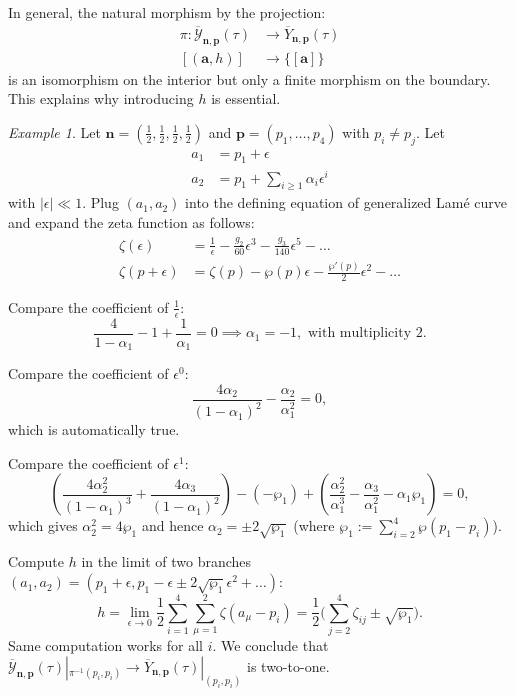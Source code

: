 \documentclass[11pt]{amsart}
\theoremstyle{remark}
\newtheorem{example}[theorem]{Example}
\numberwithin{equation}{section}
\begin{document}
In general, the natural morphism by the projection:
\[
\begin{split}
    \pi: \overline{\mathcal{Y}}_{\mathbf{n},\mathbf{p}}(\tau) &\rightarrow \overline{Y}_{\mathbf{n},\mathbf{p}}(\tau)
    \\
    [ (\mathbf{a},h) ] & \rightarrow \{ [\mathbf{a}] \}
\end{split}
\]
is an isomorphism on the interior but only a finite morphism on the boundary. This explains why introducing $h$ is essential.
\begin{example} \label{ex:primitive_two_h}
Let $\mathbf{n} = ( \frac{1}{2}, \frac{1}{2} ,\frac{1}{2}, \frac{1}{2})$ and $\mathbf{p} = (p_1,\dots,p_4)$ with $p_i \neq p_j$. 
Let
\begin{align*}
    a_1 &= p_1 + \epsilon \\
    a_2 &= p_1 + \sum_{i \ge 1} \alpha_i \epsilon^i
\end{align*}
with $|\epsilon| \ll 1$. Plug $(a_1, a_2)$ into the defining equation of generalized Lam\'e curve and expand the zeta function as follows:
\begin{align*}
    \zeta(\epsilon) &= \frac{1}{\epsilon} - \frac{g_2}{60}\epsilon^3 - \frac{g_3}{140}\epsilon^5 - \dots \\
    \zeta(p+\epsilon) &= \zeta(p) - \wp(p)\epsilon - \frac{\wp'(p)}{2}\epsilon^2 - \dots
\end{align*}

Compare the coefficient of $\frac{1}{\epsilon}$:
\begin{equation*}
    \frac{4}{1-\alpha_1} - 1 + \frac{1}{\alpha_1} = 0 \implies \alpha_1 = -1, \text{ with multiplicity 2}.
\end{equation*}

Compare the coefficient of $\epsilon^0$:
\begin{equation*}
    \frac{4\alpha_2}{(1-\alpha_1)^2} - \frac{\alpha_2}{\alpha_1^2} = 0,
\end{equation*}
which is automatically true.

Compare the coefficient of $\epsilon^1$:
\begin{equation*}
    \left( \frac{4\alpha_2^2}{(1-\alpha_1)^3} + \frac{4\alpha_3}{(1-\alpha_1)^2} \right) - (-\wp_1) + \left( \frac{\alpha_2^2}{\alpha_1^3} - \frac{\alpha_3}{\alpha_1^2} - \alpha_1\wp_1 \right) = 0,
\end{equation*}
which gives $\alpha_2^2 = 4\wp_1$ and hence $\alpha_2 = \pm 2\sqrt{\wp_1}$ (where $\wp_1 := \sum_{i=2}^4 \wp(p_1 - p_i)$).

Compute $h$ in the limit of two branches $(a_1, a_2) = (p_1 + \epsilon, p_1 - \epsilon \pm 2\sqrt{\wp_1}\epsilon^2 + \dots)$:
\[
    h = \lim_{\epsilon \rightarrow 0} \frac{1}{2} \sum_{i=1}^4\sum_{\mu=1}^2\zeta(a_\mu - p_i) = \frac{1}{2} \Big( \sum_{j=2}^4 \zeta_{ij} \pm \sqrt{\wp_1} \Big). 
\]
Same computation works for all $i$. We conclude that $\overline{\mathcal{Y}}_{\mathbf{n},\mathbf{p}}(\tau) |_{\pi^{-1}(p_i,p_i)} \rightarrow \overline{Y}_{\mathbf{n},\mathbf{p}}(\tau) |_ {(p_i,p_i)}$ is two-to-one. 
\end{example}
\end{document}
